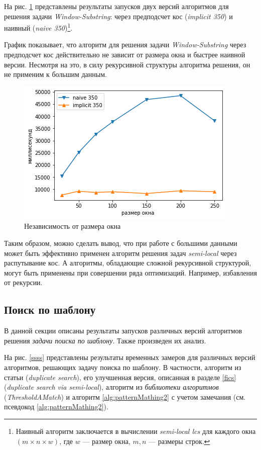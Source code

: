 На рис. \ref{fig:speedWindow3} представлены результаты запусков двух версий алгоритмов для решения задачи \emph{Window-Substring}: через предподсчет кос (\emph{implicit 350}) и наивный (\emph{naive 350})\footnote{Наивный алгоритм заключается в вычислении \emph{semi-local lcs} для каждого окна $(m \times n \times w)$, где $w$ --- размер окна, $m,n$ --- размеры строк.
}.



График  показывает, что алгоритм для решения задачи \emph{Window-Substring} через предподсчет кос действительно не зависит от размера окна и быстрее наивной версии.
Несмотря на это, в силу рекурсивной структуры  алгоритма решения, он не применим к большим данным.

\begin{figure}[H]
\centering
    \includegraphics[width=0.6\columnwidth]{figures/windowNaiveImpl.png}
    \caption{Независимость от размера окна }\label{fig:speedWindow3}
\end{figure}


Таким образом, можно сделать вывод, что  при работе с большими данными может быть эффективно применен алгоритм решения задач \emph{semi-local} через распутывание кос. 
А алгоритмы, обладающие сложной рекурсивной структурой, могут быть применены при совершении ряда оптимизаций. Например, избавления от рекурсии.

\subsection{Поиск по шаблону}
В данной секции описаны результаты запусков различных версий алгоритмов решения \emph{задачи поиска по шаблону}. Также произведен их анализ.

На рис. \ref{ssss}  представлены результаты временных замеров для  различных версий алгоритмов, решающих задачу поиска по шаблону.
В частности, алгоритм из статьи \cite{luciv2019interactive} (\emph{duplicate search}), его улучшенная версия, описанная в разделе \ref{fics} (\emph{duplicate search via semi-local}), алгоритм из \emph{библиотеки алгоритмов} (\emph{ThresholdAMatch}) и алгоритм \ref{alg:patternMathing2} с учетом замечания (см. псевдокод \ref{alg:patternMathing2}).

